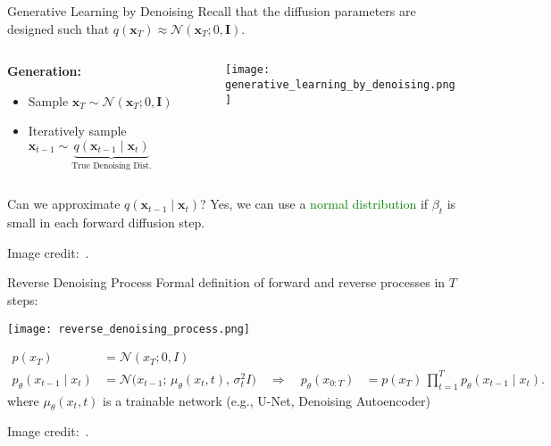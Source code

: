 \begin{refsection}
\begin{frame}{Generative Learning by Denoising}
  Recall that the diffusion parameters are designed such that $q(\mathbf{x}_T) \approx \mathcal{N}(\mathbf{x}_T; 0, \mathbf{I})$.
  \begin{columns}
    \begin{column}{0.4\textwidth}
      \textbf{Generation:}
      \begin{itemize}
        \item Sample $\mathbf{x}_T \sim \mathcal{N}(\mathbf{x}_T; 0, \mathbf{I})$
        \item Iteratively sample $\mathbf{x}_{t-1} \sim \underbrace{q(\mathbf{x}_{t-1} \mid \mathbf{x}_t)}_{\text{True Denoising Dist.}}$
      \end{itemize}
    \end{column}
    \begin{column}{0.6\textwidth}
      \centering
      \texttt{[image: generative\_learning\_by\_denoising.png]}
    \end{column}
  \end{columns}
  Can we approximate $q(\mathbf{x}_{t-1} \mid \mathbf{x}_t)$? Yes, we can use a \textcolor{green}{normal distribution} if $\beta_t$ is small in each forward diffusion step.

  \scriptsize Image credit:~\cite{CVPR2023Tutorial}.
  \bottomleftrefs
\end{frame}
\end{refsection}

\begin{refsection}
\begin{frame}{Reverse Denoising Process}
  Formal definition of forward and reverse processes in $T$ steps:
  \begin{center}
    \texttt{[image: reverse\_denoising\_process.png]}
  \end{center}
  \vspace{-2em}
  \begin{align*}
    p(x_T) &= \mathcal{N}(x_T; 0, I) \\
    p_\theta(x_{t-1}\mid x_t)
    &= \mathcal{N}\bigl(x_{t-1};\,\mu_\theta(x_t, t),\,\sigma_t^2 I\bigr)\quad
    \Rightarrow\quad
    p_\theta(x_{0:T})
    &= p(x_T)\,\prod_{t=1}^T p_\theta(x_{t-1}\mid x_t).
  \end{align*}
    \scriptsize
    where $\mu_\theta(x_t, t)$ is a trainable network (e.g., U-Net, Denoising Autoencoder)

    \scriptsize Image credit:~\cite{CVPR2023Tutorial}.
    \bottomleftrefs
\end{frame}
\end{refsection}

